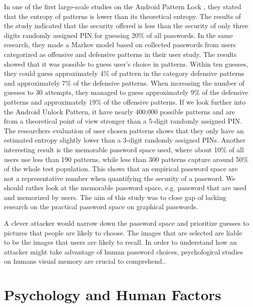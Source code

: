   In one of the first large-scale studies on the Android Pattern Lock \cite{Uellenbeck}, they stated that the entropy of patterns is lower than its theoretical entropy. The results of the study indicated that the security offered is less than the security of only three digits randomly assigned PIN for guessing 20\% of all passwords. In the same research, they made a Markov model based on collected passwords from users categorized as offensive and defensive patterns in their user study. The results showed that it was possible to guess user's choice in patterns. Within ten guesses, they could guess approximately 4\% of pattern in the category defensive patterns and approximately 7\% of the defensive patterns. When increasing the number of guesses to 30 attempts, they managed to guess approximately 9\% of the defensive patterns and approximately 19\% of the offensive patterns. If we look further into the Android Unlock Pattern, it have nearly 400.000 possible patterns and are from a theoretical point of view stronger than a 5-digit randomly assigned PIN. The researchers evaluation of user chosen patterns shows that they only have an estimated entropy slightly lower than a 3-digit randomly assigned PINs. Another interesting result is the memorable password space used, where about 10\% of all users use less than 190 patterns, while less than 300 patterns capture around 50\% of the whole test population. This shows that an empirical password space are not a representative number when quantifying the security of a password. We should rather look at the memorable password space, e.g. password that are used and memorized by users. The aim of this study was to close gap of lacking research on the practical password space on graphical passwords.

  A clever attacker would narrow down the password space and prioritize guesses to pictures that people are likely to choose. The images that are selected are liable to be the images that users are likely to recall. In order to understand how an attacker might take advantage of human password choices, psychological studies on humans visual memory are crucial to comprehend.. 

\clearpage
\section{Psychology and Human Factors}

